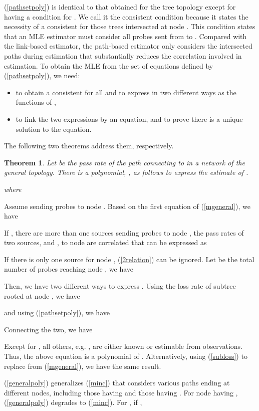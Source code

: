 \documentclass[10pt,twocolumn]{IEEEtran}
\newtheorem{theorem}{\hspace*{1pc}Theorem}
\begin{document}
(\ref{pathsetpoly}) is identical to that obtained for the tree
topology except for having a condition for . We call it
the consistent condition because it states the necessity of a
consistent  for those trees intersected at node . This
condition states that an MLE estimator must consider all probes sent
from  to . Compared with the link-based estimator, the
path-based estimator only considers the intersected paths during
estimation that substantially reduces the correlation involved in
estimation.
 To obtain the MLE  from the set of equations defined by (\ref{pathsetpoly}), we need:
 \begin{itemize}
 \item to obtain a consistent  for all  and to express  in two different ways as
 the functions of ,
 \item to link the two expressions by an equation, and to prove there is a unique solution to the equation.
 \end{itemize}
 \noindent The following two theorems address
them, respectively.
\begin{theorem} \label{jointnodetheorem}
Let  be the pass rate of the path connecting 
to  in a network of the general topology.
There is a polynomial, , as follows to express the
estimate of .

where



\end{theorem}

\begin{IEEEproof}
Assume   sending probes to node . Based on the first
equation of (\ref{mgeneral}), we have



\noindent  If , there are more than one sources sending
probes to node , the pass rates of two sources,  and , to node  are correlated that can be expressed as




\noindent If there is only one source for node , (\ref{2relation})
can be ignored. Let  be the total number of probes reaching
node , we have



\noindent Then, we have two different ways to express .
Using the loss rate of subtree  rooted at node , we have


\noindent and using (\ref{pathsetpoly}), we have

 
  \noindent Connecting the two, we have


\noindent Except for , all others, e.g. , are either known or estimable from observations. Thus, the
above equation is a polynomial of . Alternatively, using
(\ref{subloss}) to replace  from (\ref{mgeneral}), we have
the same result.
\end{IEEEproof}
(\ref{generalpoly}) generalizes (\ref{minc}) that considers various
paths ending at different nodes, including those having  and
those having . For node  having ,
(\ref{generalpoly}) degrades to (\ref{minc}). For , if ,
\end{document}

